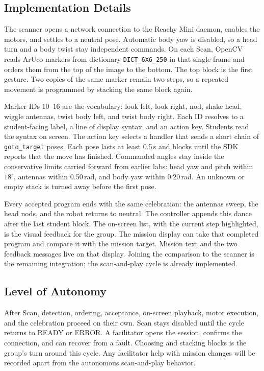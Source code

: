 \documentclass[conference,12pt,letterpaper]{IEEEtran}
\begin{document}
\subsection{Implementation Details}

The scanner opens a network connection to the Reachy Mini daemon, enables the motors, and settles to a neutral pose. Automatic body yaw is disabled, so a head turn and a body twist stay independent commands. On each Scan, OpenCV reads ArUco markers from dictionary \texttt{DICT\_6X6\_250} in that single frame and orders them from the top of the image to the bottom. The top block is the first gesture. Two copies of the same marker remain two steps, so a repeated movement is programmed by stacking the same block again.

Marker IDs 10--16 are the vocabulary: look left, look right, nod, shake head, wiggle antennas, twist body left, and twist body right. Each ID resolves to a student-facing label, a line of display syntax, and an action key. Students read the syntax on screen. The action key selects a handler that sends a short chain of \texttt{goto\_target} poses. Each pose lasts at least 0.5\,s and blocks until the SDK reports that the move has finished. Commanded angles stay inside the conservative limits carried forward from earlier labs: head yaw and pitch within $18^{\circ}$, antennas within 0.50\,rad, and body yaw within 0.20\,rad. An unknown or empty stack is turned away before the first pose.

Every accepted program ends with the same celebration: the antennas sweep, the head nods, and the robot returns to neutral. The controller appends this dance after the last student block. The on-screen list, with the current step highlighted, is the visual feedback for the group. The mission display can take that completed program and compare it with the mission target. Mission text and the two feedback messages live on that display. Joining the comparison to the scanner is the remaining integration; the scan-and-play cycle is already implemented.

\subsection{Level of Autonomy}

After Scan, detection, ordering, acceptance, on-screen playback, motor execution, and the celebration proceed on their own. Scan stays disabled until the cycle returns to READY or ERROR. A facilitator opens the session, confirms the connection, and can recover from a fault. Choosing and stacking blocks is the group's turn around this cycle. Any facilitator help with mission changes will be recorded apart from the autonomous scan-and-play behavior.
\end{document}
